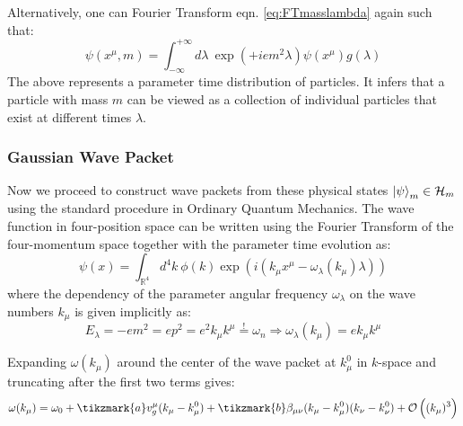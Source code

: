 \documentclass[twoside,a4paper,11pt]{article}
\numberwithin{equation}{section}
\begin{document}
Alternatively, one can Fourier Transform eqn. \ref{eq:FTmasslambda} again such that:
\begin{equation}
    \psi (x^\mu, m) = \int_{-\infty}^{+\infty}  d\lambda \   \exp{\left( +i em^2 \lambda\right)} \psi(x^\mu) g(\lambda)
    \label{eq:FTmasslambdaInLambda}
\end{equation}
The above represents a parameter time distribution of particles. It infers that a particle with mass $m$ can be viewed as a collection of individual particles that exist at different times $\lambda$.


\subsubsection{Gaussian Wave Packet}
\label{subsub:gaussian}
Now we proceed to construct wave packets from these physical states $\ket{\psi}_m \in \mathcal{H}_m$ using the standard procedure in Ordinary Quantum Mechanics. The wave function in four-position space can be written using the Fourier Transform of the four-momentum space together with the parameter time evolution as:
\begin{equation}
    \psi(x) = \int_{\mathbb{R}^4} d^4k \ \phi(k)  \exp{\left(i (k_\mu x^\mu - \omega_\lambda (k_\mu) \lambda) \right)}
    \label{Fouriermomentumspace}
\end{equation}
where the dependency of the parameter angular frequency $\omega_\lambda$ on the wave numbers $k_\mu$ is given implicitly as:
\begin{equation}
    E_\lambda = - e m^2 = e p^2 = e  ^2 k_\mu k^\mu \stackrel{!}{=}  \omega_n \Rightarrow \omega_\lambda (k_\mu) = e  k_\mu k^\mu
\end{equation}


Expanding $\omega(k_\mu)$ around the center of the wave packet at $k_\mu^0$ in $k$-space and truncating after the first two terms gives:
\begin{equation}
    \omega(k_\mu) = \omega_0 + \tikzmark{a}v_g^\mu (k_\mu - k_\mu^0) + \tikzmark{b}\beta_{\mu\nu} (k_\mu - k_\mu^0) (k_\nu - k_\nu^0) + \mathcal{O}\left((k_\mu)^3\right)
\end{equation}

\end{document}
